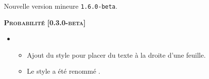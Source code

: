 Nouvelle version mineure \verb+1.6.0-beta+.




\begin{center}
    \textbf{\textsc{Probabilité [0.3.0-beta]}}
\end{center}

\begin{itemize}[itemsep=.5em]
    \item {}
    \begin{itemize}[itemsep=.5em]
        \item Ajout du style  pour placer du texte à la droite d'une feuille.

        \item Le style  a été renommé .
    \end{itemize}

    
\end{itemize}


\separation
